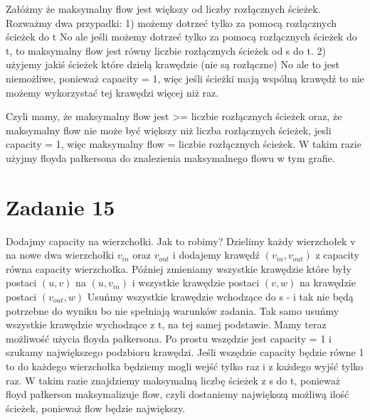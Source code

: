 \documentclass[12pt]{article}
\begin{document}
Załóżmy że maksymalny flow jest większy od liczby rozłącznych ścieżek.
Rozważmy dwa przypadki:
1) możemy dotrzeć tylko za pomocą rozłącznych ścieżek do t
No ale jeśli możemy dotrzeć tylko za pomocą rozłącznych ścieżek do t, to maksymalny flow jest równy liczbie rozłącznych ścieżek od s do t. 
2) użyjemy jakiś ścieżek które dzielą krawędzie (nie są rozłączne)
No ale to jest niemożliwe, ponieważ capacity = 1, więc jeśli ścieżki mają wspólną krawędź to nie możemy wykorzystać tej krawędzi więcej niż raz.

Czyli mamy, że maksymalny flow jest >= liczbie rozłącznych ścieżek oraz, że maksymalny flow nie może być większy niż liczba rozłącznych ścieżek, jesli capacity = 1, więc maksymalny flow = liczbie rozłącznych ścieżek. W takim razie użyjmy floyda pałkersona do znalezienia maksymalnego flowu w tym grafie.



\section{Zadanie 15} %
Dodajmy capacity na wierzchołki. 
Jak to robimy?
Dzielimy każdy wierzchołek v na nowe dwa wierzchołki $v_{in}$ oraz $v_{out}$ i dodajemy krawędź $(v_{in}, v_{out})$ z capacity równa capacity wierzchołka. Później zmieniamy wszystkie krawędzie które były postaci $(u, v)$ na $(u, v_{in})$ i wszystkie krawędzie postaci $(v, w)$ na krawędzie postaci $(v_{out}, w)$
Usuńmy wszystkie krawędzie wchodzące do s - i tak nie będą potrzebne do wyniku bo nie spełniają warunków zadania. Tak samo usuńmy wszystkie krawędzie wychodzące z t, na tej samej podstawie.
Mamy teraz możliwość użycia floyda pałkersona. Po prostu wszędzie jest capacity = 1 i szukamy największego podzbioru krawędzi. Jeśli wszędzie capacity będzie równe 1 to do każdego wierzchołka będziemy mogli wejść tylko raz i z każdego wyjść tylko raz. W takim razie znajdziemy maksymalną liczbę ścieżek z s do t, ponieważ floyd pałkerson maksymalizuje flow, czyli dostaniemy największą możliwą ilość ścieżek, ponieważ flow będzie największy.
\egroup
\end{document}
